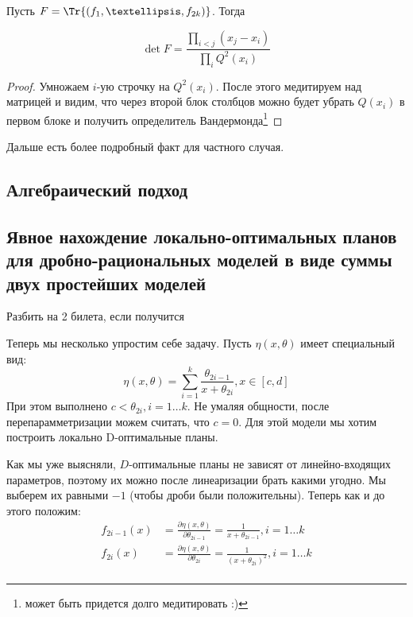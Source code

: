 Пусть $F = \Tr{(f_1, …, f_{2k})}$. Тогда 
\begin{thm}
\begin{equation}
\label{rationModelDet}
\det F = \frac{\prod\limits_{i<j} (x_j - x_i)}{\prod\limits_{i} Q^2(x_i)}
\end{equation}
\end{thm}
\begin{proof}
Умножаем  $i$-ую строчку на $Q^2(x_i)$. После этого медитируем над матрицей и видим, что через второй блок столбцов можно будет убрать $Q(x_i)$ в первом блоке и получить определитель Вандермонда\footnote{может быть придется долго медитировать :)}
\end{proof}

{\color{blue} Дальше есть более подробный факт для частного случая. }

\subsection{Алгебраический подход}
\subsection{Явное нахождение локально-оптимальных планов для дробно-рациональных моделей в виде суммы двух простейших моделей}

{\color{blue} Разбить на 2 билета, если получится}

Теперь мы несколько упростим себе задачу. Пусть $\eta(x, \theta)$ имеет специальный вид:
\begin{equation}
\label{simplRatModel}
\eta(x,\theta) = \sum\limits_{i=1}^{k} \frac{\theta_{2i-1}}{x+\theta_{2i}}, x\in[c,d]
\end{equation}
При этом выполнено $c < \theta_{2i}, i=1…k$. Не умаляя общности, после перепарамметризации можем считать,  что $c=0$. Для этой модели мы хотим построить локально D-оптимальные планы.

Как мы уже выясняли, $D$-оптимальные планы не зависят от линейно-входящих параметров, поэтому их можно после линеаризации брать какими угодно. Мы выберем их равными $-1$ (чтобы дроби были положительны). Теперь как и до этого положим:
\begin{align*}
f_{2i-1}(x) &= \frac{\partial \eta(x, \theta)}{\partial{\theta_{2i-1}}} = \frac{1}{x+\theta_{2i-1}}, i =1 … k \\
f_{2i}(x) &= \frac{\partial \eta(x, \theta)}{\partial{\theta_{2i}}} = \frac{1}{(x+\theta_{2i})^2}, i =1…k\\
\end{align*}

